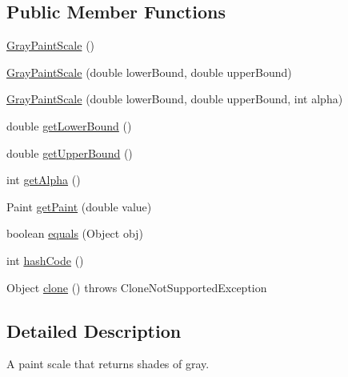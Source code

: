 \subsection*{Public Member Functions}
\begin{DoxyCompactItemize}
\item 
\mbox{\hyperlink{classorg_1_1jfree_1_1chart_1_1renderer_1_1_gray_paint_scale_a1bfeb37ece92959f386ea27d2afed7c7}{Gray\+Paint\+Scale}} ()
\item 
\mbox{\hyperlink{classorg_1_1jfree_1_1chart_1_1renderer_1_1_gray_paint_scale_a9598b2206f6aa7fa0c870bb04c1e98ad}{Gray\+Paint\+Scale}} (double lower\+Bound, double upper\+Bound)
\item 
\mbox{\hyperlink{classorg_1_1jfree_1_1chart_1_1renderer_1_1_gray_paint_scale_a7c297981120440ae78b0f2327a7da866}{Gray\+Paint\+Scale}} (double lower\+Bound, double upper\+Bound, int alpha)
\item 
double \mbox{\hyperlink{classorg_1_1jfree_1_1chart_1_1renderer_1_1_gray_paint_scale_aa66a8fc46c5cf10fd357d677e93ec48f}{get\+Lower\+Bound}} ()
\item 
double \mbox{\hyperlink{classorg_1_1jfree_1_1chart_1_1renderer_1_1_gray_paint_scale_a5420a928eca3df6dc07e2400ff89cab9}{get\+Upper\+Bound}} ()
\item 
int \mbox{\hyperlink{classorg_1_1jfree_1_1chart_1_1renderer_1_1_gray_paint_scale_a7e67a017f30b8287b6664647ee433ef4}{get\+Alpha}} ()
\item 
Paint \mbox{\hyperlink{classorg_1_1jfree_1_1chart_1_1renderer_1_1_gray_paint_scale_af4b201fbb96918235cc5e92bd5815910}{get\+Paint}} (double value)
\item 
boolean \mbox{\hyperlink{classorg_1_1jfree_1_1chart_1_1renderer_1_1_gray_paint_scale_a01d2b763ac18311cf705fd6c8ebc3e6c}{equals}} (Object obj)
\item 
int \mbox{\hyperlink{classorg_1_1jfree_1_1chart_1_1renderer_1_1_gray_paint_scale_a14607607420ae77369321fc1bbd15bd0}{hash\+Code}} ()
\item 
Object \mbox{\hyperlink{classorg_1_1jfree_1_1chart_1_1renderer_1_1_gray_paint_scale_aa6c17936614a809587e077d5cb7aedd2}{clone}} ()  throws Clone\+Not\+Supported\+Exception 
\end{DoxyCompactItemize}


\subsection{Detailed Description}
A paint scale that returns shades of gray.

